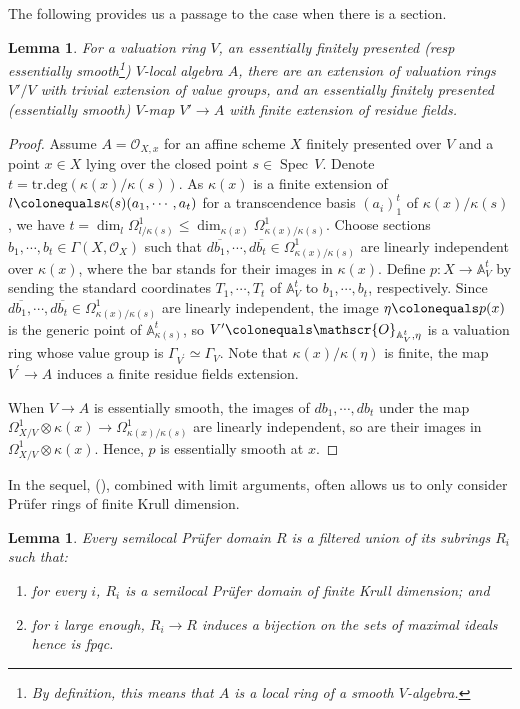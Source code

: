\documentclass[JEP,XML,SOM,Unicode,published]{cedram}
\newenvironment{enumeratei}
{\bgroup\def\theenumi{\roman{enumi}}\def\theenumii{\arabic{enumii}}\begin{enumerate}}
{\end{enumerate}\egroup}
\newcommand{\GG}{\Gamma}
\newcommand{\bA}{\mathbb{A}}
\newcommand{\sO}{\mathscr{O}}
\let\ce\colonequals
\newcommand{\pr}{^{\prime}}
\DeclareMathOperator{\Spec}{Spec}
\newcommand{\bpf}{\begin{proof}}
\newcommand{\epf}{\end{proof}}
\newcommand{\blem}{\begin{lemma}}
\newcommand{\elem}{\end{lemma}}
\newcommand{\benumr}{\begin{enumeratei}}
\newcommand{\eenumr}{\end{enumeratei}}
\theoremstyle{plain}
\newtheorem{lemma}[subsection]{Lemma}
\theoremstyle{definition}
\begin{document}
The following  provides us a passage to the case when there is a section.
\blem\label{enlarge valuation rings}
For a valuation ring $V$, an essentially finitely presented (resp essen\-tially smooth\footnote{By definition, this means that $A$ is a local ring of a smooth $V$-algebra.}) $V$-local algebra $A$, there are an extension of valuation rings $V'/V$ with trivial extension of value groups, and an essentially finitely presented (\resp essentially smooth) $V$-map $V'\to A$ with finite extension of residue fields.
\elem
\bpf
Assume $A=\sO_{X,x}$ for an affine scheme $X$ finitely presented over $V$ and a point $x\in X$ lying over the closed point $s \in \Spec\,V$. Denote $t=\text{tr.deg}(\kappa(x)/\kappa(s))$.
As $\kappa(x)$ is a finite extension of $l\ce \kappa(s)(a_1,\cdots, a_t)$ for a transcendence basis $(a_i)_1^t$ of $\kappa(x)/\kappa(s)$, we have $t=\dim_l\Omega^1_{l/\kappa(s)}\leq \dim_{\kappa(x)}\Omega_{\kappa(x)/\kappa(s)}^1$.
Choose sections $b_1,\cdots,b_t\in \GG(X,\sO_X)$ such that $d\overline{b_1},\cdots,d\overline{b_t} \in \Omega^1_{\kappa(x)/\kappa(s)} $ are linearly independent over $\kappa(x)$, where the bar stands for their images in $\kappa(x)$.
Define $p:X\to \mathbb{A}_V^t$ by sending the standard coordinates $T_1,\cdots, T_t$ of $\mathbb{A}_V^t$ to $b_1,\cdots, b_t$, respectively.
Since $d\overline{b_1},\cdots,d\overline{b_t} \in \Omega^1_{\kappa(x)/\kappa(s)} $ are linearly independent, the image $\eta\ce p(x)$ is the generic point of $\bA^t_{\kappa(s)}$, so $V\pr\ce \sO_{\bA^t_{V},\eta}$ is a valuation ring whose value group is $\GG_{V\pr}\simeq \GG_V$.
Note that $\kappa(x)/\kappa(\eta)$ is finite, the map $V\pr\to A$ induces a finite residue fields extension.

When $V\to A$ is essentially smooth, the images of $db_1,\cdots,db_t $ under the map $\Omega^1_{X/V}\otimes \kappa(x) \to \Omega^1_{\kappa(x)/\kappa(s)}$ are linearly independent, so are their images in $\Omega^1_{X/V}\otimes \kappa(x)$. Hence, $p$ is essentially smooth at $x$.
\epf
In the sequel,  (\cf \cite[Lem.\,2.2]{GL23}), combined with limit arguments, often allows us to only consider Prüfer rings of finite Krull dimension.
\blem \label{approxm semi-local Prufer ring}
Every semilocal Prüfer domain $R$ is a {filtered union} of its subrings $ R_i$ such that:
\benumr
\item for every $i$, $R_i$ is a semilocal Prüfer domain of finite Krull dimension; and
\item for $i$ large enough, $R_i\to R$ induces a bijection on the sets of maximal ideals hence is fpqc.
\eenumr
\elem
\end{document}
